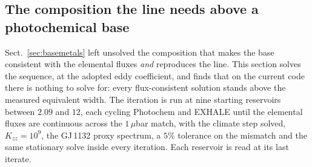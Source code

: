 \documentclass[english,a4paper]{my_memo}
\begin{document}
\subsection{The composition the line needs above a photochemical base}
\label{sec:closureladder}

Sect.~\ref{sec:basemetals} left unsolved the composition that makes the base
consistent with the elemental fluxes \emph{and} reproduces the line. This
section solves the sequence, at the adopted eddy coefficient, and finds that
on the current code there is nothing to solve for: every flux-consistent
solution stands above the measured equivalent width. The iteration is run at
nine starting reservoirs between $2.09$ and $12$, each cycling Photochem and
EXHALE until the elemental fluxes are continuous across the $1\,\mu$bar
match, with the climate step solved, $K_{zz} = 10^{9}$, the GJ\,1132 proxy
spectrum, a $5\%$ tolerance on the mismatch and the same stationary solve
inside every iteration. Each reservoir is read at its last iterate.
\end{document}
